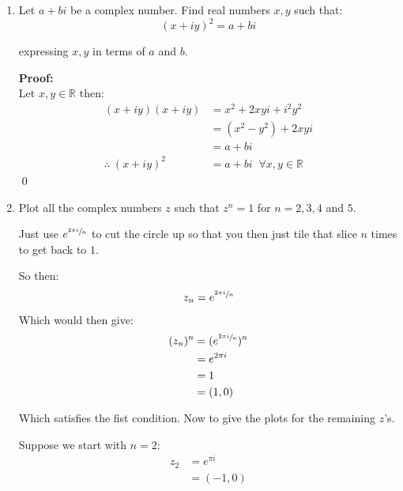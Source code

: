 \begin{enumerate}
	\item Let $a + bi$ be a complex number. Find real numbers $x, y$ such that:
	      \[(x + iy)^2 = a + bi\]

	      expressing $x, y$ in terms of $a$ and $b.$

	      \textbf{Proof:} \\
	      Let $x, y \in \mathbb{R}$ then:
	      \begin{align*}
		      (x + iy)(x + iy)         & = x^2 +2xyi + i^2 y^2                     \\
		                               & = (x^2 - y^2) + 2xyi                      \\
		                               & = a + bi                                  \\
		      \therefore \; (x + iy)^2 & = a + bi \;\; \forall x, y \in \mathbb{R}
	      \end{align*}
	      \qed

	\item Plot all the complex numbers $z$ such that $z^n = 1$ for $ n = 2, 3, 4$ and $5.$

	      Just use $ e^{ \sfrac{2 \pi i}{n} } $ to cut the circle up so that you then just tile that
	      slice $n$ times to get back to $1.$

	      So then:
	      \begin{align*}
		      z_n & = e^{ \sfrac{2 \pi i}{n} } \\
	      \end{align*}
	      Which would then give:
	      \begin{align*}
		      (z_n)^n & = ( e^{ \sfrac{2 \pi i}{n} } )^n \\
		              & = e^{2 \pi i }                   \\
		              & = 1                              \\
		              & = (1, 0)                         \\
	      \end{align*}

	      Which satisfies the fist condition. Now to give the plots for the remaining $z$'s.

	      Suppose we start with $n = 2:$
	      \begin{align*}
		      z_2 & = e^{ \pi i} \\
		          & = (-1, 0)    \\
	      \end{align*}


\end{enumerate}
